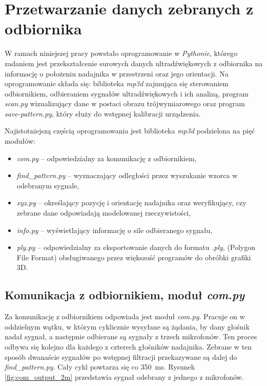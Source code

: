 \chapter{Przetwarzanie danych zebranych z odbiornika}

W ramach niniejszej pracy powstało oprogramowanie w \textit{Pythonie}, którego zadaniem jest
przekształcenie surowych danych ultradźwiękowych 
z odbiornika na informację o położeniu nadajnika w przestrzeni oraz jego orientacji.
Na oprogramowanie składa się: biblioteka \textit{mp3d} zajmująca się
sterowaniem odbiornikiem, odbieraniem sygnałów ultradźwiękowych i ich analizą, program \textit{scan.py}
wizualizujący dane w postaci obrazu trójwymiarowego oraz program \textit{save-pattern.py},
który służy do wstępnej kalibracji urządzenia.

Najistotniejszą częścią oprogramowania jest biblioteka \textit{mp3d} podzielona na pięć modułów:
\begin{itemize}
 \item \textit{com.py} --  odpowiedzialny za komunikację z odbiornikiem,
 \item \textit{find\_pattern.py} --  wyznaczający odległości przez wyszukanie wzorca w odebranym sygnale,
 \item \textit{xyz.py} --  określający pozycję i orientację nadajnika oraz  weryfikujący, 
 czy zebrane dane odpowiadają modelowanej rzeczywistości,
 \item \textit{info.py} --  wyświetlający informację o sile odbieranego sygnału,
 \item \textit{ply.py} --  odpowiedzialny za eksportowanie danych do formatu \textit{.ply},
    (Polygon File Format) obsługiwanego przez większość programów do obróbki grafiki 3D.
\end{itemize}


\section{Komunikacja z odbiornikiem, moduł \textit{com.py}}

Za komunikację z odbiornikiem odpowiada jest moduł \textit{com.py}.
Pracuje on w oddzielnym wątku, w którym cyklicznie wysyłane są żądania, by dany głośnik nadał sygnał,
a następnie odbierane są sygnały z trzech mikrofonów.
Ten proces odbywa się kolejno dla każdego z czterech głośników nadajnika.
Zebrane w ten sposób dwanaście sygnałów po wstępnej filtracji przekazywane są dalej do \textit{find\_pattern.py}. Cały cykl powtarza 
się co \SI{350}{ms}. Rysunek \ref{fig:com_output_2m} przedstawia sygnał odebrany z jednego z mikrofonów.


